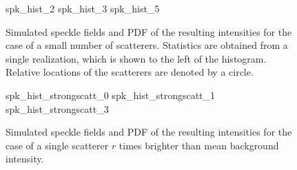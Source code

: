 \begin{figure}[ht]
\centering
{spk_hist_2}
{spk_hist_3}
{spk_hist_5}
\caption{Simulated speckle fields and PDF of the resulting intensities for
the case of a small number of scatterers.  Statistics are obtained from a
single realization, which is shown to the left of the histogram.  Relative
locations of the scatterers are denoted by a circle.}
\label{fig:lowscatthist}
\end{figure}

\begin{figure}[ht]
\centering
{spk_hist_strongscatt_0}
{spk_hist_strongscatt_1}
{spk_hist_strongscatt_3}
\caption{Simulated speckle fields and PDF of the resulting intensities for
the case of a single scatterer $r$ times brighter than mean background
intensity.}
\label{fig:strongsinglefig}
\end{figure}
